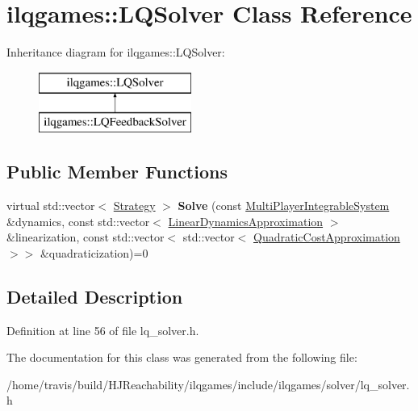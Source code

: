 \hypertarget{classilqgames_1_1_l_q_solver}{}\section{ilqgames\+:\+:L\+Q\+Solver Class Reference}
\label{classilqgames_1_1_l_q_solver}
Inheritance diagram for ilqgames\+:\+:L\+Q\+Solver\+:\begin{figure}[H]
\begin{center}
\leavevmode
\includegraphics[height=2.000000cm]{classilqgames_1_1_l_q_solver}
\end{center}
\end{figure}
\subsection*{Public Member Functions}
\begin{DoxyCompactItemize}
\item 
virtual std\+::vector$<$ \hyperlink{structilqgames_1_1_strategy}{Strategy} $>$ {\bfseries Solve} (const \hyperlink{classilqgames_1_1_multi_player_integrable_system}{Multi\+Player\+Integrable\+System} \&dynamics, const std\+::vector$<$ \hyperlink{structilqgames_1_1_linear_dynamics_approximation}{Linear\+Dynamics\+Approximation} $>$ \&linearization, const std\+::vector$<$ std\+::vector$<$ \hyperlink{structilqgames_1_1_quadratic_cost_approximation}{Quadratic\+Cost\+Approximation} $>$$>$ \&quadraticization)=0\hypertarget{classilqgames_1_1_l_q_solver_a8e3a907068d6165aaab1c96226a1c56b}{}\label{classilqgames_1_1_l_q_solver_a8e3a907068d6165aaab1c96226a1c56b}

\end{DoxyCompactItemize}


\subsection{Detailed Description}


Definition at line 56 of file lq\+\_\+solver.\+h.



The documentation for this class was generated from the following file\+:\begin{DoxyCompactItemize}
\item 
/home/travis/build/\+H\+J\+Reachability/ilqgames/include/ilqgames/solver/lq\+\_\+solver.\+h\end{DoxyCompactItemize}
